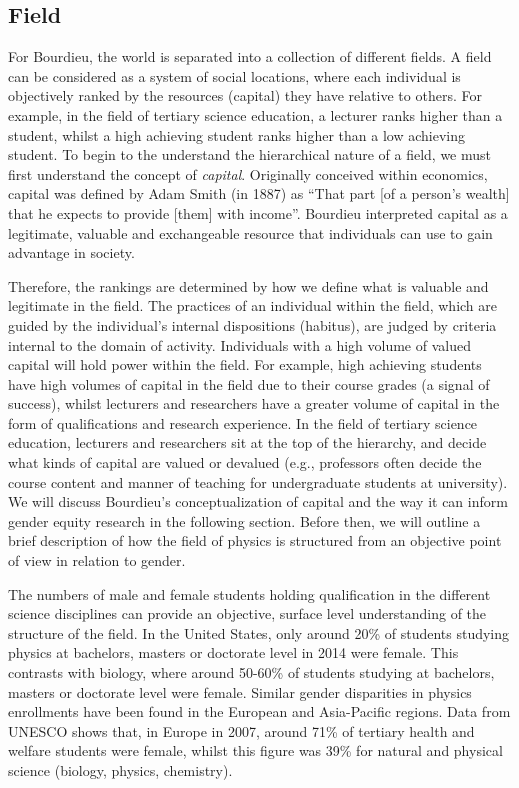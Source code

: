 \subsection*{Field}
For Bourdieu, the world is separated into a collection of different fields.\cite{Bourdieu1984} A field can be considered as a system of social locations, where each individual is objectively ranked by the resources (capital) they have relative to others. For example, in the field of tertiary science education, a lecturer ranks higher than a student, whilst a high achieving student ranks higher than a low achieving student. To begin to the understand the hierarchical nature of a field, we must first understand the concept of \textit{capital}. Originally conceived within economics, capital was defined by Adam Smith (in 1887) as ``That part [of a person's wealth] that he expects to provide [them] with \textellipsis income\textellipsis''.\cite{Smith_1887} Bourdieu interpreted capital as a legitimate, valuable and exchangeable resource that individuals can use to gain advantage in society.\cite{Bourdieu_1986}

Therefore, the rankings are determined by how we define what is valuable and legitimate in the field. The practices of an individual within the field, which are guided by the individual's internal dispositions (habitus), are judged by criteria internal to the domain of activity.\cite{hilgers2014introduction} Individuals with a high volume of valued capital will hold power within the field. For example, high achieving students have high volumes of capital in the field due to their course grades (a signal of success), whilst lecturers and researchers have a greater volume of capital in the form of qualifications and research experience. In the field of tertiary science education, lecturers and researchers sit at the top of the hierarchy, and decide what kinds of capital are valued or devalued (e.g., professors often decide the course content and manner of teaching for undergraduate students at university). We will discuss Bourdieu's conceptualization of capital and the way it can inform gender equity research in the following section. Before then, we will outline a brief description of how the field of physics is structured from an objective point of view in relation to gender.

The numbers of male and female students holding qualification in the different science disciplines can provide an objective, surface level understanding of the structure of the field. In the United States, only around 20\% of students studying physics at bachelors, masters or doctorate level in 2014 were female.\cite{NSF} This contrasts with biology, where around 50-60\% of students studying at bachelors, masters or doctorate level were female.\cite{NSF} Similar gender disparities in physics enrollments have been found in the European\cite{InstituteofPhysics_2012,InstituteofPhysics_2013, Stevanovic_2013} and Asia-Pacific regions.\cite{Abraham_2014, Kennedy_2014} Data from UNESCO  shows that, in Europe in 2007, around 71\% of tertiary health and welfare students were female, whilst this figure was 39\% for natural and physical science (biology, physics, chemistry).\cite{Huyer2007} 

